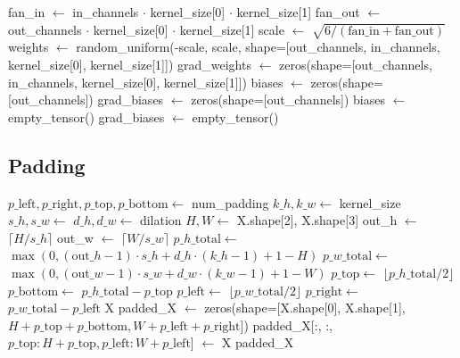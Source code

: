 \documentclass{article}
\begin{document}
\begin{algorithm}
\caption{Initialize Parameters and Gradients}
\begin{algorithmic}[1]
    \State fan\_in $\gets$ in\_channels $\cdot$ kernel\_size[0] $\cdot$ kernel\_size[1]
    \State fan\_out $\gets$ out\_channels $\cdot$ kernel\_size[0] $\cdot$ kernel\_size[1]
    \State scale $\gets$ $\sqrt{6 / (\text{fan}\_{\text{in}} + \text{fan}\_{\text{out}})}$
    \State weights $\gets$ random\_uniform(-scale, scale, shape=[out\_channels, in\_channels, kernel\_size[0], kernel\_size[1]])
    \State grad\_weights $\gets$ zeros(shape=[out\_channels, in\_channels, kernel\_size[0], kernel\_size[1]])
        \State biases $\gets$ zeros(shape=[out\_channels])
        \State grad\_biases $\gets$ zeros(shape=[out\_channels])
    \Else
        \State biases $\gets$ empty\_tensor()
        \State grad\_biases $\gets$ empty\_tensor()
    \EndIf
\EndFunction
\end{algorithmic}
\end{algorithm}

\subsection{Padding}
\begin{algorithm}
\caption{Pad Input}
\begin{algorithmic}[1]
    \State $p\_{\text{left}}, p\_{\text{right}}, p\_{\text{top}}, p\_{\text{bottom}} \gets$ num\_padding
        \State $k\_h, k\_w \gets$ kernel\_size
        \State $s\_h, s\_w \gets$ 
        \State $d\_h, d\_w \gets$ dilation
        \State $H, W \gets$ X.shape[2], X.shape[3]
        \State out\_h $\gets$ $\lceil H / s\_h \rceil$
        \State out\_w $\gets$ $\lceil W / s\_w \rceil$
        \State $p\_{h\_{\text{total}}} \gets$ $\max(0, (\text{out}\_h - 1) \cdot s\_h + d\_h \cdot (k\_h - 1) + 1 - H)$
        \State $p\_{w\_{\text{total}}} \gets$ $\max(0, (\text{out}\_w - 1) \cdot s\_w + d\_w \cdot (k\_w - 1) + 1 - W)$
        \State $p\_{\text{top}} \gets$ $\lfloor p\_{h\_{\text{total}}} / 2 \rfloor$
        \State $p\_{\text{bottom}} \gets$ $p\_{h\_{\text{total}}} - p\_{\text{top}}$
        \State $p\_{\text{left}} \gets$ $\lfloor p\_{w\_{\text{total}}} / 2 \rfloor$
        \State $p\_{\text{right}} \gets$ $p\_{w\_{\text{total}}} - p\_{\text{left}}$
    \EndIf
        \State \Return X
    \EndIf
    \State padded\_X $\gets$ zeros(shape=[X.shape[0], X.shape[1], $H + p\_{\text{top}} + p\_{\text{bottom}}, W + p\_{\text{left}} + p\_{\text{right}}$])
    \State padded\_X[:, :, $p\_{\text{top}}:H+p\_{\text{top}}, p\_{\text{left}}:W+p\_{\text{left}}$] $\gets$ X
    \State \Return padded\_X
\EndFunction
\end{algorithmic}
\end{algorithm}
\end{document}
